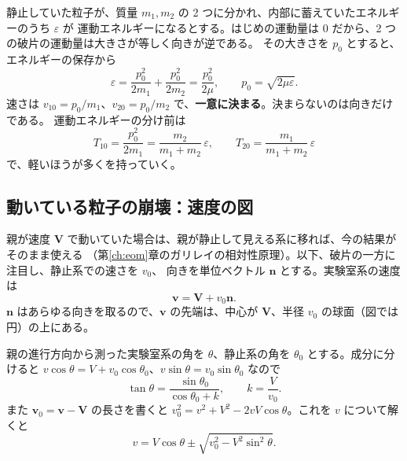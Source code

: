 静止していた粒子が、質量 $m_1,m_2$ の 2 つに分かれ、内部に蓄えていたエネルギーのうち $\varepsilon$ が
運動エネルギーになるとする。はじめの運動量は 0 だから、2 つの破片の運動量は大きさが等しく向きが逆である。
その大きさを $p_0$ とすると、エネルギーの保存から
\begin{equation}
  \varepsilon=\frac{p_0^2}{2m_1}+\frac{p_0^2}{2m_2}=\frac{p_0^2}{2\mu},
  \qquad p_0=\sqrt{2\mu\varepsilon}.
  \label{eq:decay-p0}
\end{equation}
速さは $v_{10}=p_0/m_1$、$v_{20}=p_0/m_2$ で、\textbf{一意に決まる}。決まらないのは向きだけである。
運動エネルギーの分け前は
\begin{equation}
  T_{10}=\frac{p_0^2}{2m_1}=\frac{m_2}{m_1+m_2}\,\varepsilon,\qquad
  T_{20}=\frac{m_1}{m_1+m_2}\,\varepsilon
\end{equation}
で、軽いほうが多くを持っていく。

\subsection{動いている粒子の崩壊：速度の図}

親が速度 $\bm V$ で動いていた場合は、親が静止して見える系に移れば、今の結果がそのまま使える
（第\ref{ch:eom}章のガリレイの相対性原理）。以下、破片の一方に注目し、静止系での速さを $v_0$、
向きを単位ベクトル $\bm n$ とする。実験室系の速度は
\begin{equation}
  \bm v=\bm V+v_0\bm n .
\end{equation}
$\bm n$ はあらゆる向きを取るので、$\bm v$ の先端は、中心が $\bm V$、半径 $v_0$ の球面（図では円）の上にある。


親の進行方向から測った実験室系の角を $\theta$、静止系の角を $\theta_0$ とする。成分に分けると
$v\cos\theta=V+v_0\cos\theta_0$、$v\sin\theta=v_0\sin\theta_0$ なので
\begin{equation}
  \tan\theta=\frac{\sin\theta_0}{\cos\theta_0+k},\qquad k=\frac{V}{v_0}.
  \label{eq:decay-angle}
\end{equation}
また $\bm v_0=\bm v-\bm V$ の長さを書くと $v_0^2=v^2+V^2-2vV\cos\theta$。これを $v$ について解くと
\begin{equation}
  v=V\cos\theta\pm\sqrt{v_0^2-V^2\sin^2\theta}.
  \label{eq:decay-speed}
\end{equation}

